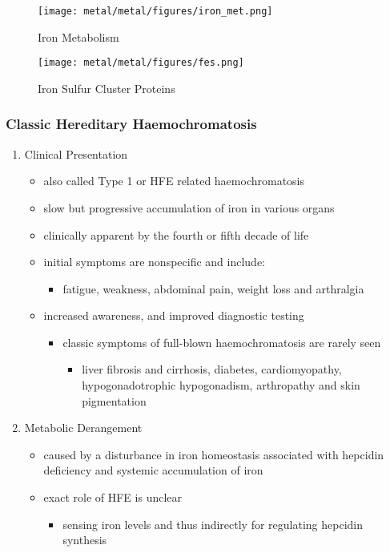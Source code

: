 \documentclass{scrartcl}
\begin{document}
\begin{figure}[htbp]
\centering
\texttt{[image: metal/metal/figures/iron\_met.png]}
\caption[iron]{\label{fig:org53081df}Iron Metabolism}
\end{figure}

\begin{figure}[htbp]
\centering
\texttt{[image: metal/metal/figures/fes.png]}
\caption[fes]{\label{fig:org720fb2e}Iron Sulfur Cluster Proteins}
\end{figure}

\subsubsection{Classic Hereditary Haemochromatosis}
\label{sec:org0202a05}
\begin{enumerate}
\item Clinical Presentation
\label{sec:orgddaca6e}
\begin{itemize}
\item also called Type 1 or HFE related haemochromatosis
\item slow but progressive accumulation of iron in various organs
\item clinically apparent by the fourth or fifth decade of life
\item initial symptoms are nonspecific and include:
\begin{itemize}
\item fatigue, weakness, abdominal pain, weight loss and arthralgia
\end{itemize}
\item increased awareness, and improved diagnostic testing
\begin{itemize}
\item classic symptoms of full-blown haemochromatosis are rarely seen
\begin{itemize}
\item liver fibrosis and cirrhosis, diabetes, cardiomyopathy,
hypogonadotrophic hypogonadism, arthropathy and skin
pigmentation
\end{itemize}
\end{itemize}
\end{itemize}

\item Metabolic Derangement
\label{sec:orge4269a9}
\begin{itemize}
\item caused by a disturbance in iron homeostasis associated with hepcidin
deficiency and systemic accumulation of iron
\item exact role of HFE is unclear
\begin{itemize}
\item sensing iron levels and thus indirectly for regulating hepcidin
synthesis
\end{itemize}
\end{itemize}


\end{enumerate}
\end{document}
